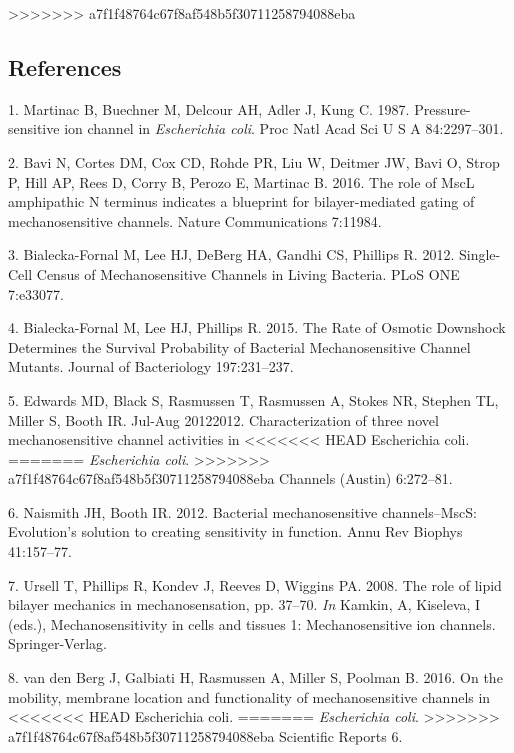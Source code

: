 >>>>>>> a7f1f48764c67f8af548b5f30711258794088eba
\subsection*{References}\label{references}

\hypertarget{refs}{}
\hypertarget{ref-martinac1987}{}
1.
Martinac
B,
Buechner
M,
Delcour
AH,
Adler
J,
Kung
C.
1987.
Pressure-sensitive
ion
channel
in
\emph{Escherichia
coli}.
Proc
Natl
Acad
Sci U
S A
84:2297--301.

\hypertarget{ref-bavi2016}{}
2.
Bavi
N,
Cortes
DM,
Cox
CD,
Rohde
PR,
Liu W,
Deitmer
JW,
Bavi
O,
Strop
P,
Hill
AP,
Rees
D,
Corry
B,
Perozo
E,
Martinac
B.
2016.
The
role
of
MscL
amphipathic
N
terminus
indicates
a
blueprint
for
bilayer-mediated
gating
of
mechanosensitive
channels.
Nature
Communications
7:11984.

\hypertarget{ref-bialecka-fornal2012}{}
3.
Bialecka-Fornal
M, Lee
HJ,
DeBerg
HA,
Gandhi
CS,
Phillips
R.
2012.
Single-Cell
Census
of
Mechanosensitive
Channels
in
Living
Bacteria.
PLoS
ONE
7:e33077.

\hypertarget{ref-bialecka-fornal2015}{}
4.
Bialecka-Fornal
M, Lee
HJ,
Phillips
R.
2015.
The
Rate
of
Osmotic
Downshock
Determines
the
Survival
Probability
of
Bacterial
Mechanosensitive
Channel
Mutants.
Journal
of
Bacteriology
197:231--237.

\hypertarget{ref-edwards2012}{}
5.
Edwards
MD,
Black
S,
Rasmussen
T,
Rasmussen
A,
Stokes
NR,
Stephen
TL,
Miller
S,
Booth
IR.
Jul-Aug
20122012.
Characterization
of
three
novel
mechanosensitive
channel
activities
in
<<<<<<< HEAD
Escherichia
coli.
=======
\emph{Escherichia
coli}.
>>>>>>> a7f1f48764c67f8af548b5f30711258794088eba
Channels
(Austin)
6:272--81.

\hypertarget{ref-naismith2012}{}
6.
Naismith
JH,
Booth
IR.
2012.
Bacterial
mechanosensitive
channels--MscS:
Evolution's
solution
to
creating
sensitivity
in
function.
Annu
Rev
Biophys
41:157--77.

\hypertarget{ref-ursell2008}{}
7.
Ursell
T,
Phillips
R,
Kondev
J,
Reeves
D,
Wiggins
PA.
2008.
The
role
of
lipid
bilayer
mechanics
in
mechanosensation,
pp.
37--70.
\emph{In}
Kamkin,
A,
Kiseleva,
I
(eds.),
Mechanosensitivity
in
cells
and
tissues
1:
Mechanosensitive
ion
channels.
Springer-Verlag.

\hypertarget{ref-vandenberg2016}{}
8. van
den
Berg
J,
Galbiati
H,
Rasmussen
A,
Miller
S,
Poolman
B.
2016.
On the
mobility,
membrane
location
and
functionality
of
mechanosensitive
channels
in
<<<<<<< HEAD
Escherichia
coli.
=======
\emph{Escherichia
coli}.
>>>>>>> a7f1f48764c67f8af548b5f30711258794088eba
Scientific
Reports
6.

